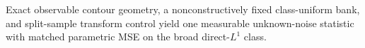 Exact observable contour geometry, a nonconstructively fixed class-uniform bank, and split-sample transform control yield one measurable unknown-noise statistic with matched parametric MSE on the broad direct-\(L^1\) class.